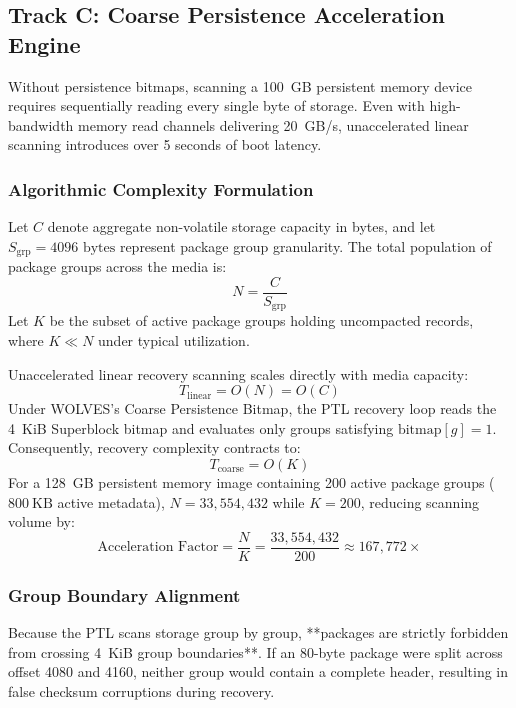 \documentclass[conference]{IEEEtran}
\begin{document}
\subsection{Track C: Coarse Persistence Acceleration Engine}
Without persistence bitmaps, scanning a 100~GB persistent memory device requires sequentially reading every single byte of storage. Even with high-bandwidth memory read channels delivering 20~GB/s, unaccelerated linear scanning introduces over 5 seconds of boot latency.

\subsubsection{Algorithmic Complexity Formulation}
Let $C$ denote aggregate non-volatile storage capacity in bytes, and let $S_{\text{grp}} = 4096\text{ bytes}$ represent package group granularity. The total population of package groups across the media is:
\begin{equation}
    N = \frac{C}{S_{\text{grp}}}
\end{equation}
Let $K$ be the subset of active package groups holding uncompacted records, where $K \ll N$ under typical utilization.

Unaccelerated linear recovery scanning scales directly with media capacity:
\begin{equation}
    T_{\text{linear}} = O(N) = O(C)
\end{equation}
Under WOLVES's Coarse Persistence Bitmap, the PTL recovery loop reads the 4~KiB Superblock bitmap and evaluates only groups satisfying $\text{bitmap}[g] = 1$. Consequently, recovery complexity contracts to:
\begin{equation}
    T_{\text{coarse}} = O(K)
\end{equation}
For a 128~GB persistent memory image containing 200 active package groups ($800~\text{KB}$ active metadata), $N = 33,554,432$ while $K = 200$, reducing scanning volume by:
\begin{equation}
    \text{Acceleration Factor} = \frac{N}{K} = \frac{33,554,432}{200} \approx 167,772\times
\end{equation}

\subsubsection{Group Boundary Alignment}
Because the PTL scans storage group by group, **packages are strictly forbidden from crossing 4~KiB group boundaries**. If an 80-byte package were split across offset 4080 and 4160, neither group would contain a complete header, resulting in false checksum corruptions during recovery.
\end{document}
